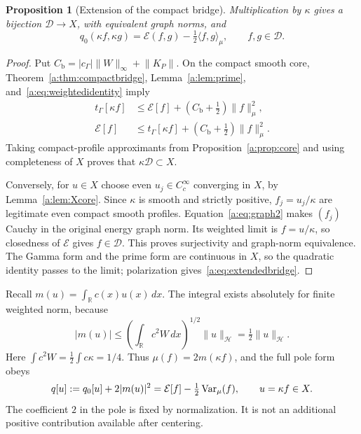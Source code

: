 \documentclass[11pt,a4paper]{article}
\numberwithin{equation}{section}
\newtheorem{proposition}[theorem]{Proposition}
\theoremstyle{definition}\newtheorem{definition}[theorem]{Definition}
\theoremstyle{remark}\newtheorem{remark}[theorem]{Remark}
\newcommand{\R}{\mathbb R}\newcommand{\C}{\mathbb C}\newcommand{\N}{\mathbb N}
\newcommand{\E}{\mathcal E}\newcommand{\D}{\mathcal D}
\newcommand{\Hh}{\mathcal H}\newcommand{\Hw}{\mathcal H}
\newcommand{\tg}{t_\Gamma}\newcommand{\cg}{c_\Gamma}
\newcommand{\ip}[2]{\langle#1,#2\rangle}\newcommand{\norm}[1]{\lVert#1\rVert}\newcommand{\abs}[1]{\lvert#1\rvert}
\begin{document}
\begin{proposition}[Extension of the compact bridge]\label{a:prop:domain}
Multiplication by $\kappa$ gives a bijection $\D\to X$, with equivalent graph norms, and
\begin{equation}\label{a:eq:extendedbridge}
 q_0(\kappa f,\kappa g)=\E(f,g)-\tfrac12\ip{f}{g}_\mu,
 \qquad f,g\in\D.
\end{equation}
\end{proposition}
\begin{proof}
Put $C_{\mathrm b}=|\cg|\norm{W}_\infty+\norm{K_P}$. On the compact smooth core, Theorem~\ref{a:thm:compactbridge}, Lemma~\ref{a:lem:prime}, and~\eqref{a:eq:weightedidentity} imply
\begin{align}
 \tg[\kappa f]&\le\E[f]+(C_{\mathrm b}+\tfrac12)\norm{f}_\mu^2,\label{a:eq:graph1}\\
 \E[f]&\le\tg[\kappa f]+(C_{\mathrm b}+\tfrac12)\norm{f}_\mu^2.\label{a:eq:graph2}
\end{align}
Taking compact-profile approximants from Proposition~\ref{a:prop:core} and using completeness of $X$ proves that $\kappa\D\subset X$.

Conversely, for $u\in X$ choose even $u_j\in C_c^\infty$ converging in $X$, by Lemma~\ref{a:lem:Xcore}. Since $\kappa$ is smooth and strictly positive, $f_j=u_j/\kappa$ are legitimate even compact smooth profiles. Equation~\eqref{a:eq:graph2} makes $(f_j)$ Cauchy in the original energy graph norm. Its weighted limit is $f=u/\kappa$, so closedness of $\E$ gives $f\in\D$. This proves surjectivity and graph-norm equivalence. The Gamma form and the prime form are continuous in $X$, so the quadratic identity passes to the limit; polarization gives~\eqref{a:eq:extendedbridge}.
\end{proof}

Recall $m(u)=\int_\R c(x)u(x)\,dx$. The integral exists absolutely for finite weighted norm, because
\begin{equation}\label{a:eq:meanbound}
 |m(u)|\le\left(\int_\R c^2W\,dx\right)^{1/2}\norm{u}_{\Hh}
       =\tfrac12\norm{u}_{\Hh}.
\end{equation}
Here $\int c^2W=\tfrac12\int c\kappa=1/4$. Thus $\mu(f)=2m(\kappa f)$, and the full pole form obeys
\begin{equation}\label{a:eq:polebridge}
 q[u]:=q_0[u]+2|m(u)|^2
       =\E[f]-\tfrac12\Var_\mu(f),\qquad u=\kappa f\in X.
\end{equation}
The coefficient $2$ in the pole is fixed by normalization. It is not an additional positive contribution available after centering.
\end{document}
